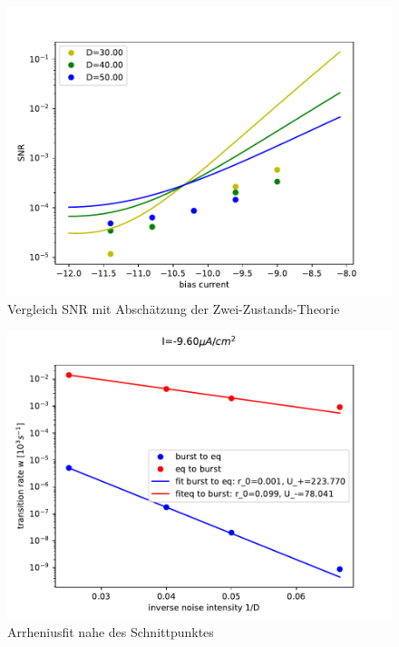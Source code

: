 \documentclass[12pt,a4paper]{article}
\begin{document}
\begin{figure}[H]
	\centering
	\includegraphics[scale=1]{snrinzelcompspratepoi2.pdf}\caption{Vergleich SNR mit Abschätzung der Zwei-Zustands-Theorie}
	\label{snrinzelcompratepoi}
\end{figure}
\begin{figure}[H]
	\centering
	\includegraphics[scale=1]{arrheniustotrealrinzelpoi26n1realrinzel15ninv0fit4.pdf}\caption{Arrheniusfit nahe des Schnittpunktes}
	\label{arrhpoi}
\end{figure}
\end{document}
